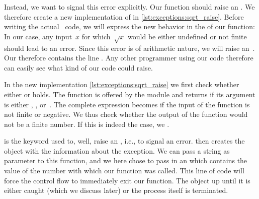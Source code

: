 Instead, we want to signal this error explicitly.
Our function should raise an .
We therefore create a new implementation of  in \cref{lst:exceptions:sqrt_raise}.
Before writing the actual \python\ code, we will express the new behavior in the  of our function:%
%
%
\fussy%
%
In our case, any input~$x$ for which~$\sqrt{x}$ would be either undefined or not finite should lead to an error.
Since this error is of arithmetic nature, we will raise an~.
Our  therefore contains the line .
Any other programmer using our code therefore can easily see what kind of  our code could raise.

In the new  implementation \cref{lst:exceptions:sqrt_raise} we first check whether either  or  holds.
The  function is offered by the  module and returns  if its argument is either , , or~.
The complete expression becomes  if the input of the function is not finite or negative.
We thus check whether the output of the  function would not be a finite number.
If this is indeed the case, we .

 is the keyword used to, well, raise an , i.e., to signal an error.
 then creates the object with the information about the exception.
We can pass a string as parameter to this function, and we here chose to pass in an  which contains the value of the number with which our  function was called.
This line of code will force the control flow to immediately exit our  function.
The  object  up until it is either caught (which we discuss later) or the process itself is terminated.

